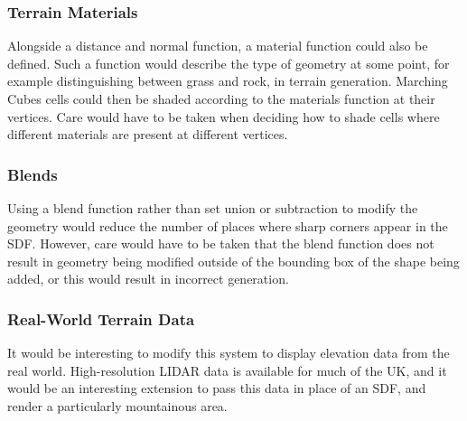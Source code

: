 \documentclass{article}
\begin{document}
\subsubsection{Terrain Materials}
Alongside a distance and normal function, a material function could also be defined. Such a function would describe the type of geometry at some point, for example distinguishing between grass and rock, in terrain generation. Marching Cubes cells could then be shaded according to the materials function at their vertices. Care would have to be taken when deciding how to shade cells where different materials are present at different vertices.
\subsubsection{Blends}
Using a blend function rather than set union or subtraction to modify the geometry would reduce the number of places where sharp corners appear in the SDF. However, care would have to be taken that the blend function does not result in geometry being modified outside of the bounding box of the shape being added, or this would result in incorrect generation.
\subsubsection{Real-World Terrain Data}
It would be interesting to modify this system to display elevation data from the real world. High-resolution LIDAR data is available for much of the UK, and it would be an interesting extension to pass this data in place of an SDF, and render a particularly mountainous area.



\end{document}
